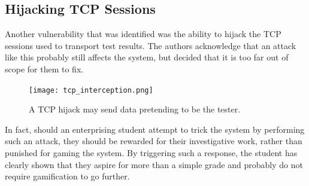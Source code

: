 \subsection{Hijacking TCP Sessions}
Another vulnerability that was identified was the ability to hijack the TCP sessions used to transport test results. The authors acknowledge that an attack like this probably still affects the system, but decided that it is too far out of scope for them to fix.
\begin{figure}
    \centering
    \texttt{[image: tcp\_interception.png]}
    \caption{A TCP hijack may send data pretending to be the tester.}
\end{figure}

In fact, should an enterprising student attempt to trick the system by performing such an attack, they should be rewarded for their investigative work, rather than punished for gaming the system. By triggering such a response, the student has clearly shown that they aspire for more than a simple grade and probably do not require gamification to go further.
